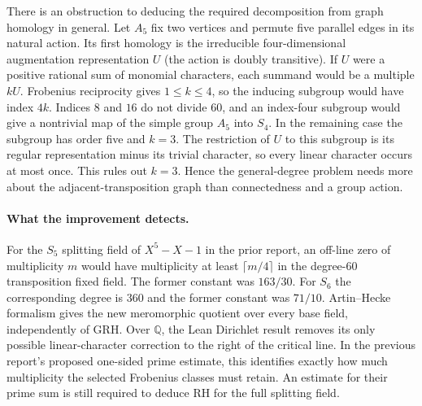 There is an obstruction to deducing the required decomposition from graph
homology in general. Let $A_5$ fix two vertices and permute five parallel
edges in its natural action. Its first homology is the irreducible
four-dimensional augmentation representation $U$ (the action is doubly
transitive). If $U$ were a positive rational sum of monomial characters,
each summand would be a multiple $kU$. Frobenius reciprocity gives
$1\le k\le4$, so the inducing subgroup would have index $4k$.
Indices $8$ and $16$ do not divide $60$, and an index-four subgroup would
give a nontrivial map of the simple group $A_5$ into $S_4$. In the
remaining case the subgroup has order five and $k=3$. The restriction of
$U$ to this subgroup is its regular representation minus its trivial
character, so every linear character occurs at most once. This rules
out $k=3$. Hence the general-degree problem needs more about the
adjacent-transposition graph than connectedness and a group action.

\paragraph{What the improvement detects.}
For the $S_5$ splitting field of $X^5-X-1$ in the prior report, an
off-line zero of multiplicity $m$ would have multiplicity at least
$\lceil m/4\rceil$ in the degree-60 transposition fixed field.
The former constant was $163/30$. For $S_6$ the corresponding degree
is $360$ and the former constant was $71/10$.
Artin--Hecke formalism gives the new meromorphic quotient over
every base field, independently of GRH. Over $\mathbb Q$, the Lean
Dirichlet result removes its only possible linear-character correction
to the right of the critical line. In the previous report's proposed
one-sided prime estimate, this identifies exactly how much multiplicity
the selected Frobenius classes must retain. An estimate for their prime
sum is still required to deduce RH for the full splitting field.
